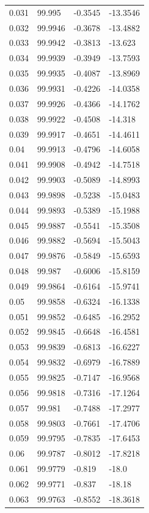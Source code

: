 \begin{tabular}{llll}
0.031 & 99.995 & -0.3545 & -13.3546 \\
0.032 & 99.9946 & -0.3678 & -13.4882 \\
0.033 & 99.9942 & -0.3813 & -13.623 \\
0.034 & 99.9939 & -0.3949 & -13.7593 \\
0.035 & 99.9935 & -0.4087 & -13.8969 \\
0.036 & 99.9931 & -0.4226 & -14.0358 \\
0.037 & 99.9926 & -0.4366 & -14.1762 \\
0.038 & 99.9922 & -0.4508 & -14.318 \\
0.039 & 99.9917 & -0.4651 & -14.4611 \\
0.04 & 99.9913 & -0.4796 & -14.6058 \\
0.041 & 99.9908 & -0.4942 & -14.7518 \\
0.042 & 99.9903 & -0.5089 & -14.8993 \\
0.043 & 99.9898 & -0.5238 & -15.0483 \\
0.044 & 99.9893 & -0.5389 & -15.1988 \\
0.045 & 99.9887 & -0.5541 & -15.3508 \\
0.046 & 99.9882 & -0.5694 & -15.5043 \\
0.047 & 99.9876 & -0.5849 & -15.6593 \\
0.048 & 99.987 & -0.6006 & -15.8159 \\
0.049 & 99.9864 & -0.6164 & -15.9741 \\
0.05 & 99.9858 & -0.6324 & -16.1338 \\
0.051 & 99.9852 & -0.6485 & -16.2952 \\
0.052 & 99.9845 & -0.6648 & -16.4581 \\
0.053 & 99.9839 & -0.6813 & -16.6227 \\
0.054 & 99.9832 & -0.6979 & -16.7889 \\
0.055 & 99.9825 & -0.7147 & -16.9568 \\
0.056 & 99.9818 & -0.7316 & -17.1264 \\
0.057 & 99.981 & -0.7488 & -17.2977 \\
0.058 & 99.9803 & -0.7661 & -17.4706 \\
0.059 & 99.9795 & -0.7835 & -17.6453 \\
0.06 & 99.9787 & -0.8012 & -17.8218 \\
0.061 & 99.9779 & -0.819 & -18.0 \\
0.062 & 99.9771 & -0.837 & -18.18 \\
0.063 & 99.9763 & -0.8552 & -18.3618 \\

\end{tabular}
